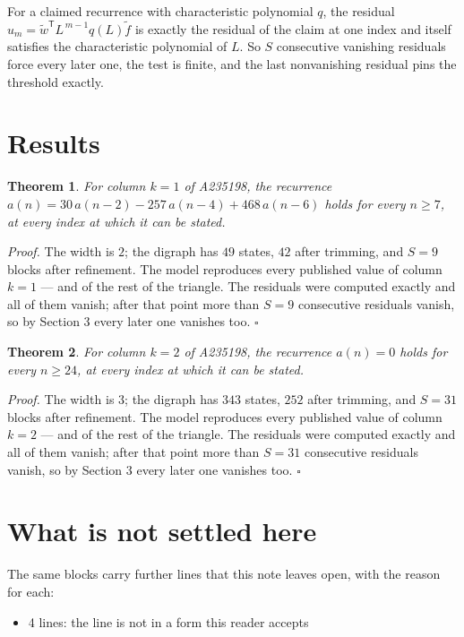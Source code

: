 \documentclass[11pt]{article}
\newtheorem{theorem}{Theorem}
\theoremstyle{definition}
\begin{document}
For a claimed recurrence with characteristic polynomial $q$, the residual $u_m = \tilde w^{\mathsf T}L^{\,m-1}q(L)\tilde f$ is exactly the residual of the claim at one index and itself satisfies the characteristic polynomial of $L$. So $S$ consecutive vanishing residuals force every later one, the test is finite, and the last nonvanishing residual pins the threshold exactly.

\section{Results}

\begin{theorem} For column $k = 1$ of A235198, the recurrence $a(n) = 30\,a(n-2) - 257\,a(n-4) + 468\,a(n-6)$ holds for every $n \ge 7$, at every index at which it can be stated.\end{theorem}

{\itshape Proof.} The width is $2$; the digraph has $49$ states, $42$ after trimming, and $S = 9$ blocks after refinement. The model reproduces every published value of column $k = 1$ --- and of the rest of the triangle. The residuals were computed exactly and all of them vanish; after that point more than $S = 9$ consecutive residuals vanish, so by Section 3 every later one vanishes too. $\square$

\begin{theorem} For column $k = 2$ of A235198, the recurrence $a(n) = 0$ holds for every $n \ge 24$, at every index at which it can be stated.\end{theorem}

{\itshape Proof.} The width is $3$; the digraph has $343$ states, $252$ after trimming, and $S = 31$ blocks after refinement. The model reproduces every published value of column $k = 2$ --- and of the rest of the triangle. The residuals were computed exactly and all of them vanish; after that point more than $S = 31$ consecutive residuals vanish, so by Section 3 every later one vanishes too. $\square$

\section{What is not settled here}

The same blocks carry further lines that this note leaves open, with the reason for each:

\begin{itemize}

\item 4 lines: the line is not in a form this reader accepts

\end{itemize}
\end{document}
